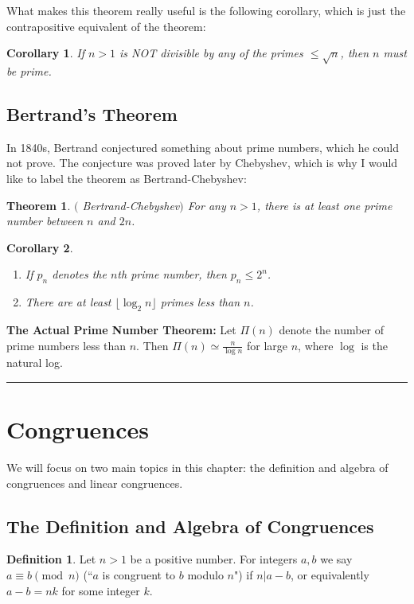 \documentclass[12pt]{article}
\theoremstyle{plain}
\newtheorem{corollary}{Corollary}
\newtheorem{theorem}{Theorem}
\theoremstyle{definition}
\newtheorem{definition}{Definition}
\theoremstyle{remark}
\begin{document}
\bigskip
\noindent
What makes this theorem really useful is the following corollary, which is just the contrapositive equivalent of the theorem:
\begin{corollary}
If $n>1$ is NOT divisible by any of the primes $\leq \sqrt{n}$, then $n$ must be prime.
\end{corollary}

\bigskip
\subsection{Bertrand's Theorem}
In 1840s, Bertrand conjectured something about prime numbers, which he could not prove. The conjecture was proved later by Chebyshev, which is why I would like to label the theorem as Bertrand-Chebyshev:
\begin{theorem}$($ Bertrand-Chebyshev$)$
For any $n>1$, there is at least one prime number between $n$ and $2n$.
\end{theorem}

\bigskip
\begin{corollary}\begin{enumerate}
    \item If $p_n$ denotes the $n$th prime number, then $p_n \leq 2^n$.
    \item There are at least $\lfloor \log_2n\rfloor $ primes less than $n$.
\end{enumerate}
\end{corollary}

\bigskip
\noindent
{\bf The Actual Prime Number Theorem:} Let $\Pi(n)$ denote the number of prime numbers less than $n$. Then $\Pi(n) \simeq \frac{n}{\log n}$ for large $n$, where $\log$ is the natural log.

\bigskip
\hrule

\section{Congruences}
We will focus on two main topics in this chapter: the definition and algebra of congruences and linear congruences.
\subsection{The Definition and Algebra of Congruences}
\begin{definition}
Let $n>1$ be a positive number. For integers $a,b$ we say $a\equiv b \pmod{n}$ (``$a$ is congruent to $b$ modulo $n$") if $n|a-b$, or equivalently $a-b=nk$ for some integer $k$.
\end{definition}
\end{document}
